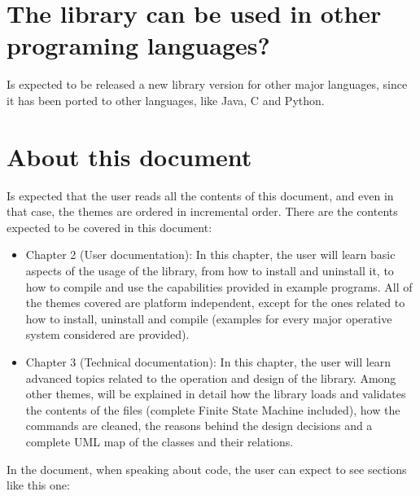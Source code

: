 \documentclass[11pt,twoside,openany,x11names,svgnames]{memoir}
\begin{document}
\section{The library can be used in other programing languages?}\label{The-library-can-be-used-in-other-programming-languages}

Is expected to be released a new library version for other major languages, since it has been ported to other languages, like Java, C and Python.

\section{About this document}\label{About-this-document}

Is expected that the user reads all the contents of this document, and even in that case, the themes are ordered in incremental order. There are the contents expected to be covered in this document:

\begin{itemize}
	\item Chapter 2 (User documentation): In this chapter, the user will learn basic aspects of the usage of the library, from how to install and uninstall it, to how to compile and use the capabilities provided in example programs. All of the themes covered are platform independent, except for the ones related to how to install, uninstall and compile (examples for every major operative system considered are provided).
	\item Chapter 3 (Technical documentation): In this chapter, the user will learn advanced topics related to the operation and design of the library. Among other themes, will be explained in detail how the library loads and validates the contents of the files (complete Finite State Machine included), how the commands are cleaned, the reasons behind the design decisions and a complete UML map of the classes and their relations.
\end{itemize}

In the document, when speaking about code, the user can expect to see sections like this one:


\end{document}
